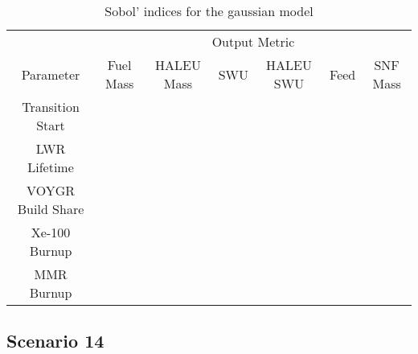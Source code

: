 \begin{table}
    \centering
    \caption{Sobol' indices for the gaussian model}
    \label{tab:s7_sobol_voygr_quadratic}
    \begin{tabular}{c c c c c c c}
        \hline
        & \multicolumn{6}{c}{Output Metric} \\
        Parameter & Fuel Mass & HALEU Mass & SWU & HALEU SWU & Feed & SNF Mass \\
        \hline
        Transition Start & \\
        LWR Lifetime & \\
        VOYGR Build Share & \\
        Xe-100 Burnup & \\
        MMR Burnup & \\
        \hline        
    \end{tabular}
\end{table}


\subsection{Scenario 14}


